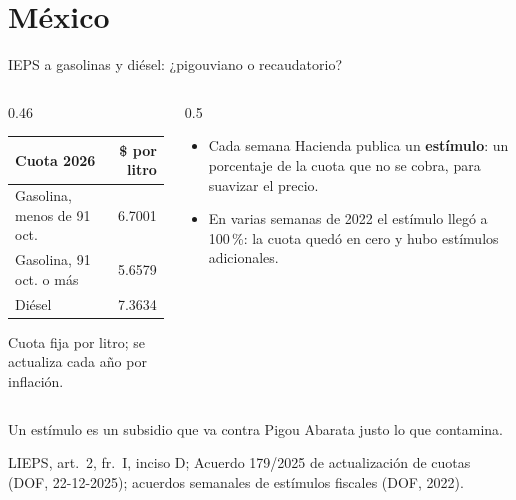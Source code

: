 \documentclass[aspectratio=169,11pt]{beamer}
\newcommand{\fuente}[1]{\par\vfill{\small\color{cGris}#1\par}}
\begin{document}
\section{México}

\begin{frame}{IEPS a gasolinas y diésel: ¿pigouviano o recaudatorio?}
  \begin{columns}[T]
    \begin{column}{0.46\textwidth}
      \centering
      \begin{tabular}{lr}
        \toprule
        Cuota 2026 & \$ por litro\\
        \midrule
        Gasolina, menos de 91 oct. & 6.7001\\
        Gasolina, 91 oct. o más & 5.6579\\
        Diésel & 7.3634\\
        \bottomrule
      \end{tabular}
      \par\smallskip
      \raggedright
      {\small Cuota fija por litro; se actualiza cada año por inflación.}
    \end{column}
    \begin{column}{0.5\textwidth}
      \pause
      \begin{itemize}
        \item Cada semana Hacienda publica un \textbf{estímulo}: un porcentaje de la cuota que no se cobra, para suavizar el precio.
        \item En varias semanas de 2022 el estímulo llegó a 100\,\%: la cuota quedó en cero y hubo estímulos adicionales.
      \end{itemize}
    \end{column}
  \end{columns}
  \pause
  \begin{alertblock}{Un estímulo es un subsidio que va contra Pigou}
    Abarata justo lo que contamina.
  \end{alertblock}
  \fuente{LIEPS, art.~2, fr.~I, inciso D; Acuerdo 179/2025 de actualización de cuotas (DOF, 22-12-2025); acuerdos semanales de estímulos fiscales (DOF, 2022).}
\end{frame}
\end{document}
